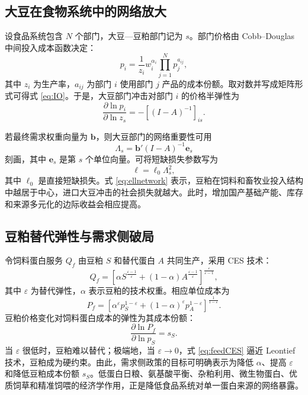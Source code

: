 \documentclass[UTF8,zihao=-4,fontset=fandol]{ctexart}
\numberwithin{equation}{section}
\theoremstyle{definition}
\theoremstyle{remark}
\begin{document}
\subsection{大豆在食物系统中的网络放大}

设食品系统包含 $N$ 个部门，大豆—豆粕部门记为 $s$。部门价格由 Cobb--Douglas 中间投入成本函数决定：
\begin{equation}
 p_i=\frac{1}{z_i}w_i^{\alpha_i}\prod_{j=1}^{N}p_j^{a_{ij}},
 \label{eq:networkprice}
\end{equation}
其中 $z_i$ 为生产率，$a_{ij}$ 为部门 $i$ 使用部门 $j$ 产品的成本份额。取对数并写成矩阵形式可得式 \eqref{eq:IO}。于是，大豆部门冲击对部门 $i$ 的价格半弹性为
\begin{equation}
 \frac{\partial\ln p_i}{\partial\ln z_s}=-\left[(I-A)^{-1}\right]_{is}.
 \label{eq:networkelasticity}
\end{equation}

若最终需求权重向量为 $\bm b$，则大豆部门的网络重要性可用
\begin{equation}
 \Lambda_s=\bm b'(I-A)^{-1}\bm e_s
 \label{eq:domar}
\end{equation}
刻画，其中 $\bm e_s$ 是第 $s$ 个单位向量。可将短缺损失参数写为
\begin{equation}
 \ell=\ell_0\Lambda_s^2,
 \label{eq:ellnetwork}
\end{equation}
其中 $\ell_0$ 是直接短缺损失。式 \eqref{eq:ellnetwork} 表示，豆粕在饲料和畜牧业投入结构中越居于中心，进口大豆冲击的社会损失就越大。此时，增加国产基础产能、库存和来源多元化的边际收益会相应提高。

\subsection{豆粕替代弹性与需求侧破局}

令饲料蛋白服务 $Q_f$ 由豆粕 $S$ 和替代蛋白 $A$ 共同生产，采用 CES 技术：
\begin{equation}
 Q_f=\left[\alpha S^{\frac{\varepsilon-1}{\varepsilon}}+(1-\alpha)A^{\frac{\varepsilon-1}{\varepsilon}}\right]^{\frac{\varepsilon}{\varepsilon-1}},
 \label{eq:feedCES}
\end{equation}
其中 $\varepsilon$ 为替代弹性，$\alpha$ 表示豆粕的技术权重。相应单位成本为
\begin{equation}
 P_f=\left[\alpha^{\varepsilon}p_S^{1-\varepsilon}+(1-\alpha)^{\varepsilon}p_A^{1-\varepsilon}\right]^{\frac{1}{1-\varepsilon}}.
 \label{eq:feedcost}
\end{equation}
豆粕价格变化对饲料蛋白成本的弹性为其成本份额：
\begin{equation}
 \frac{\partial\ln P_f}{\partial\ln p_S}=s_S.
 \label{eq:shareelasticity}
\end{equation}
当 $\varepsilon$ 很低时，豆粕难以替代；极端地，当 $\varepsilon\rightarrow0$，式 \eqref{eq:feedCES} 逼近 Leontief 技术，豆粕成为硬约束。由此，需求侧政策的目标可明确表示为降低 $\alpha$、提高 $\varepsilon$ 和降低豆粕成本份额 $s_S$。低蛋白日粮、氨基酸平衡、杂粕利用、微生物蛋白、优质饲草和精准饲喂的经济学作用，正是降低食品系统对单一蛋白来源的网络暴露。
\end{document}
